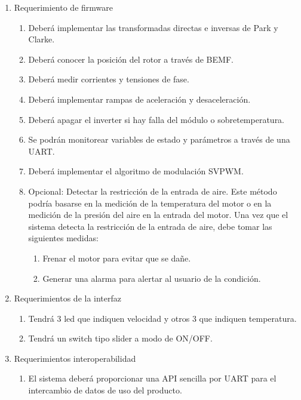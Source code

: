 \documentclass[
11pt, %
codirector, %
]{charter}
\begin{document}
\begin{enumerate}
\begin{enumerate}
	      \end{enumerate}
	\item Requerimiento de firmware
	      \begin{enumerate}
		      \item Deberá implementar las transformadas directas e inversas de Park y Clarke.
		      \item Deberá conocer la posición del rotor a través de BEMF.
		      \item Deberá medir corrientes y tensiones de fase.
		      \item Deberá implementar rampas de aceleración y desaceleración.
		      \item Deberá apagar el inverter si hay falla del módulo o sobretemperatura.
		      \item Se podrán monitorear variables de estado y parámetros a través de una UART.
		      \item Deberá implementar el algoritmo de modulación SVPWM.
		      \item Opcional: Detectar la restricción de la entrada de aire. Este método podría basarse en la medición de la temperatura del motor o en la medición de la presión del aire en la entrada del motor.
		            Una vez que el sistema detecta la restricción de la entrada de aire, debe tomar las siguientes medidas:
		            \begin{enumerate}
			            \item Frenar el motor para evitar que se dañe.
			            \item Generar una alarma para alertar al usuario de la condición.
		            \end{enumerate}
	      \end{enumerate}
	\item Requerimientos de la interfaz
	      \begin{enumerate}
		      \item Tendrá 3 led que indiquen velocidad y otros 3 que indiquen temperatura.
		      \item Tendrá un switch tipo slider a modo de ON/OFF.
	      \end{enumerate}
	\item Requerimientos interoperabilidad
	      \begin{enumerate}
		      \item El sistema deberá proporcionar una API sencilla por UART para el intercambio de datos de uso del producto.
	      \end{enumerate}

\end{enumerate}
\end{document}
